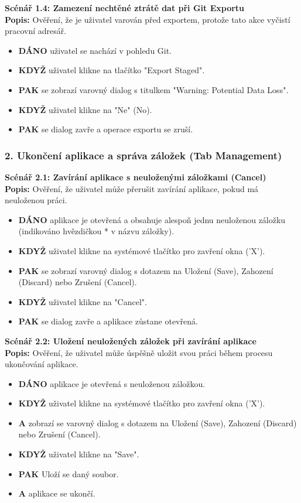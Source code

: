 \documentclass[12pt, a4paper]{article}
\begin{document}
\textbf{Scénář 1.4: Zamezení nechtěné ztrátě dat při Git Exportu} \\
\textbf{Popis:} Ověření, že je uživatel varován před exportem, protože tato akce vyčistí pracovní adresář.
\begin{itemize}
    \item \textbf{DÁNO} uživatel se nachází v pohledu Git.
    \item \textbf{KDYŽ} uživatel klikne na tlačítko "Export Staged".
    \item \textbf{PAK} se zobrazí varovný dialog s titulkem "Warning: Potential Data Loss".
    \item \textbf{KDYŽ} uživatel klikne na "Ne" (No).
    \item \textbf{PAK} se dialog zavře a operace exportu se zruší.
\end{itemize}

\subsubsection*{2. Ukončení aplikace a správa záložek (Tab Management)}

\textbf{Scénář 2.1: Zavírání aplikace s neuloženými záložkami (Cancel)} \\
\textbf{Popis:} Ověření, že uživatel může přerušit zavírání aplikace, pokud má neuloženou práci.
\begin{itemize}
    \item \textbf{DÁNO} aplikace je otevřená a obsahuje alespoň jednu neuloženou záložku (indikováno hvězdičkou * v názvu záložky).
    \item \textbf{KDYŽ} uživatel klikne na systémové tlačítko pro zavření okna ('X').
    \item \textbf{PAK} se zobrazí varovný dialog s dotazem na Uložení (Save), Zahození (Discard) nebo Zrušení (Cancel).
    \item \textbf{KDYŽ} uživatel klikne na "Cancel".
    \item \textbf{PAK} se dialog zavře a aplikace zůstane otevřená.
\end{itemize}

\textbf{Scénář 2.2: Uložení neuložených záložek při zavírání aplikace} \\
\textbf{Popis:} Ověření, že uživatel může úspěšně uložit svou práci během procesu ukončování aplikace.
\begin{itemize}
    \item \textbf{DÁNO} aplikace je otevřená s neuloženou záložkou.
    \item \textbf{KDYŽ} uživatel klikne na systémové tlačítko pro zavření okna ('X').
    \item \textbf{A} zobrazí se varovný dialog s dotazem na Uložení (Save), Zahození (Discard) nebo Zrušení (Cancel).
    \item \textbf{KDYŽ} uživatel klikne na "Save".
    \item \textbf{PAK} Uloží se daný soubor.
    \item \textbf{A} aplikace se ukončí.
\end{itemize}
\end{document}
